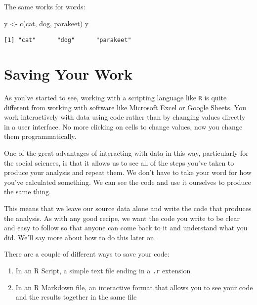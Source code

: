 \documentclass[
  letterpaper,
]{book}
\newenvironment{Shaded}{\begin{snugshade}}{\end{snugshade}}
\newcommand{\FunctionTok}[1]{\textcolor[rgb]{0.28,0.35,0.67}{#1}}
\newcommand{\NormalTok}[1]{\textcolor[rgb]{0.00,0.23,0.31}{#1}}
\newcommand{\OtherTok}[1]{\textcolor[rgb]{0.00,0.23,0.31}{#1}}
\newcommand{\StringTok}[1]{\textcolor[rgb]{0.13,0.47,0.30}{#1}}
\begin{document}
\begin{enumerate}
\begin{tcolorbox}
  The same works for words:

\begin{Shaded}
\begin{Highlighting}[]
\NormalTok{y }\OtherTok{\textless{}{-}} \FunctionTok{c}\NormalTok{(}\StringTok{\textquotesingle{}cat\textquotesingle{}}\NormalTok{, }\StringTok{\textquotesingle{}dog\textquotesingle{}}\NormalTok{, }\StringTok{\textquotesingle{}parakeet\textquotesingle{}}\NormalTok{)}
\NormalTok{y}
\end{Highlighting}
\end{Shaded}

\begin{verbatim}
[1] "cat"      "dog"      "parakeet"
\end{verbatim}

  \end{tcolorbox}
\end{enumerate}

\hypertarget{saving-your-work}{%
\section{Saving Your Work}\label{saving-your-work}}

As you've started to see, working with a scripting language like
\texttt{R} is quite different from working with software like Microsoft
Excel or Google Sheets. You work interactively with data using code
rather than by changing values directly in a user interface. No more
clicking on cells to change values, now you change them
programmatically.

One of the great advantages of interacting with data in this way,
particularly for the social sciences, is that it allows us to see all of
the steps you've taken to produce your analysis and repeat them. We
don't have to take your word for how you've calculated something. We can
see the code and use it ourselves to produce the same thing.

This means that we leave our source data alone and write the code that
produces the analysis. As with any good recipe, we want the code you
write to be clear and easy to follow so that anyone can come back to it
and understand what you did. We'll say more about how to do this later
on.

There are a couple of different ways to save your code:

\begin{enumerate}
\def\labelenumi{\arabic{enumi}.}
\item
  In an R Script, a simple text file ending in a \texttt{.r} extension
\item
  In an R Markdown file, an interactive format that allows you to see
  your code and the results together in the same file
\end{enumerate}
\end{document}
